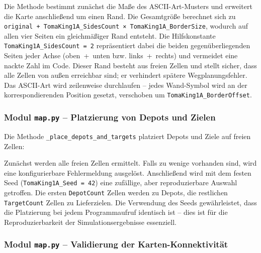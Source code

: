 

Die Methode bestimmt zunächst die Maße des \acs{ASCII}-Art-Musters und erweitert die Karte anschließend um einen Rand. Die Gesamtgröße berechnet sich zu \texttt{original + TomaKing1A\_SidesCount × TomaKing1A\_BorderSize}, wodurch auf allen vier Seiten ein gleichmäßiger Rand entsteht. Die Hilfskonstante \texttt{TomaKing1A\_SidesCount = 2} repräsentiert dabei die beiden gegenüberliegenden Seiten jeder Achse (oben~+~unten bzw. links~+~rechts) und vermeidet eine nackte Zahl im Code. Dieser Rand besteht aus freien Zellen und stellt sicher, dass alle Zellen von außen erreichbar sind; er verhindert spätere Wegplanungsfehler. Das \acs{ASCII}-Art wird zeilenweise durchlaufen – jedes Wand-Symbol wird an der korrespondierenden Position gesetzt, verschoben um \texttt{TomaKing1A\_BorderOffset}.


\subsubsection{Modul \texttt{map.py} – Platzierung von Depots und Zielen}

Die Methode \texttt{\_place\_depots\_and\_targets} platziert Depots und Ziele auf freien Zellen:



Zunächst werden alle freien Zellen ermittelt. Falls zu wenige vorhanden sind, wird eine konfigurierbare Fehlermeldung ausgelöst. Anschließend wird mit dem festen Seed (\texttt{TomaKing1A\_Seed = 42}) eine zufällige, aber reproduzierbare Auswahl getroffen. Die ersten \texttt{DepotCount} Zellen werden zu Depots, die restlichen \texttt{TargetCount} Zellen zu Lieferzielen. Die Verwendung des Seeds gewährleistet, dass die Platzierung bei jedem Programmaufruf identisch ist – dies ist für die Reproduzierbarkeit der Simulationsergebnisse essenziell.


\subsubsection{Modul \texttt{map.py} – Validierung der Karten-Konnektivität}

